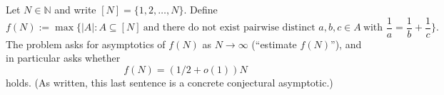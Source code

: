 Let $N\in\mathbb{N}$ and write $[N]=\{1,2,\dots,N\}$. Define
\[
  f(N) := \max\Big\{ |A| : A\subseteq [N]\ \text{and there do not exist pairwise distinct }a,b,c\in A\ \text{with }\frac1a=\frac1b+\frac1c\Big\}.
\]
The problem asks for asymptotics of $f(N)$ as $N\to\infty$ (``estimate $f(N)$''), and in particular asks whether
\[
  f(N)=(1/2+o(1))N
\]
holds. (As written, this last sentence is a concrete conjectural asymptotic.)
